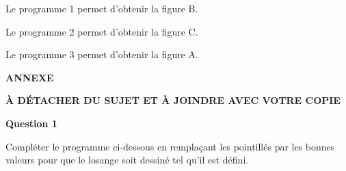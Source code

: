 \begin{enumerate}
%
%
%
%
%
Le programme 1 permet d'obtenir la figure B.

Le programme 2 permet d'obtenir la figure C.

Le programme 3 permet d'obtenir la figure A.
\end{enumerate}

\begin{center}\textbf{\large ANNEXE}

\vspace{1cm} 

\textbf{À DÉTACHER DU SUJET ET À JOINDRE AVEC VOTRE COPIE }
\end{center}


\bigskip

\textbf{Question 1 }

\medskip

Compléter le programme ci-dessous en remplaçant les pointillés par les bonnes valeurs pour que le losange soit dessiné tel qu'il est défini. 

